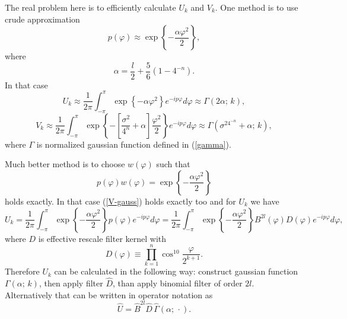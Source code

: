 \documentclass[10pt]{article}
\begin{document}
The real problem here is to efficiently calculate $U_k$ and $V_k$. One method is to use crude
approximation
\begin{equation}
    p(\varphi) \approx \exp\left\{-\frac{\alpha\varphi^2}2\right\},
\end{equation}
where
\begin{equation}\label{alpha}
    \alpha = \frac l2 + \frac56(1 - 4^{-n}).
\end{equation}
In that case
\begin{equation}
    U_k \approx \frac1{2\pi}\int_{-\pi}^\pi
        \exp\left\{-\alpha\varphi^2\right\}e^{-ip\varphi}d\varphi \approx \Gamma(2\alpha;\, k),
\end{equation}
\begin{equation}\label{V-gauss}
    V_k \approx \frac1{2\pi}\int_{-\pi}^\pi
        \exp\left\{-\left[\frac{\sigma^2}{4^n} + \alpha\right]\frac{\varphi^2}2\right\}
        e^{-ip\varphi}d\varphi \approx \Gamma(\sigma^24^{-n} + \alpha;\, k),
\end{equation}
where $\Gamma$ is normalized gaussian function defined in (\ref{gamma}).

Much better method is to choose $w(\varphi)$ such that
\begin{equation}
    p(\varphi)w(\varphi) = \exp\left\{-\frac{\alpha\varphi^2}2\right\}
\end{equation}
holds exactly. In that case (\ref{V-gauss}) holds exactly too and for $U_k$ we
have
\begin{equation}
    U_k = \frac1{2\pi}\int_{-\pi}^\pi \exp\left\{-\frac{\alpha\varphi^2}2\right\}
        p(\varphi)e^{-ip\varphi}d\varphi =
    \frac1{2\pi}\int_{-\pi}^\pi \exp\left\{-\frac{\alpha\varphi^2}2\right\}
        B^{2l}(\varphi)D(\varphi)e^{-ip\varphi}d\varphi,
\end{equation}
where $D$ is effective rescale filter kernel with
\begin{equation}
    D(\varphi) \equiv \prod_{k=1}^n \cos^{10}\frac\varphi{2^{k+1}}.
\end{equation}
Therefore $U_k$ can be calculated in the following way: construct gaussian function
$\Gamma(\alpha;\, k)$, then apply filter $\hat D$, than apply binomial filter of order $2l$.
Alternatively that can be written in operator notation as
\begin{equation}
    \hat U = \hat B^{2l}\hat D\,\hat\Gamma(\alpha;\, \cdot).
\end{equation}
\end{document}
